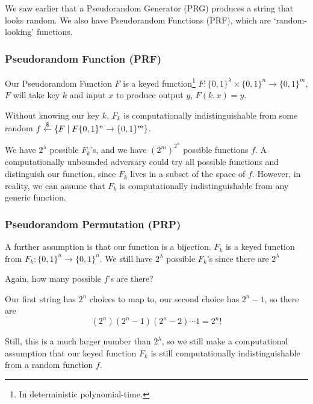 We saw earlier that a Pseudorandom Generator (PRG) produces a string that looks random. We also have Pseudorandom Functions (PRF), which are `random-looking' functions.

\subsubsection{Pseudorandom Function (PRF)}

Our Pseudorandom Function $F$ is a keyed function\footnote{In deterministic polynomial-time.} $F : \{0, 1\}^\lambda\times \{0, 1\}^n\to\{0, 1\}^m$, $F$ will take key $k$ and input $x$ to produce output $y$, $F(k, x) = y$.

Without knowing our key $k$, $F_k$ is computationally indistinguishable from some random $f\overset{\$}{\leftarrow}\{F\mid F\{0, 1\}^n\to \{0, 1\}^m\}$.


We have $2^\lambda$ possible $F_k$'s, and we have $(2^m)^{2^n}$ possible functions $f$. A computationally unbounded adversary could try all possible functions and distinguish our function, since $F_k$ lives in a subset of the space of $f$. However, in reality, we can assume that $F_k$ is computationally indistinguishable from any generic function.

\subsubsection{Pseudorandom Permutation (PRP)}

A further assumption is that our function is a bijection. $F_k$ is a keyed function from $F_k : \{0, 1\}^n\to\{0, 1\}^n$. We still have $2^\lambda$ possible $F_k$'s since there are $2^\lambda$


\begin{ques*}
    Again, how many possible $f$'s are there?
\end{ques*}
Our first string has $2^n$ choices to map to, our second choice has $2^n - 1$, so there are
\[(2^n)(2^n-1)(2^n-2)\cdots 1 = 2^n!\]

Still, this is a much larger number than $2^\lambda$, so we still make a computational assumption that our keyed function $F_k$ is still computationally indistinguishable from a random function $f$.